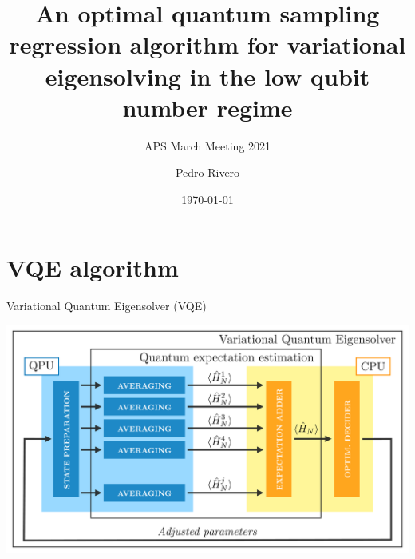 \documentclass[9pt, handout, aspectratio=169]{beamer}	%
\title{An optimal quantum sampling regression algorithm for variational eigensolving in the low qubit number regime}
\subtitle{APS March Meeting 2021}
\author{Pedro Rivero}
\institute{Illinois Institute of Technology \\ Argonne National Laboratory}
\date{\today}
\begin{document}
	\justify
	\setlength{\abovedisplayskip}{0pt}
	\setlength{\belowdisplayskip}{12pt}
	\setlength{\abovedisplayshortskip}{0pt}
	\setlength{\belowdisplayshortskip}{12pt}

\begin{frame}[plain,t]
	\titlepage
\end{frame}




\section{VQE algorithm}

\begin{frame}{Variational Quantum Eigensolver (VQE)}

	\begin{center}
		\includegraphics[width=.7\paperwidth]{Figures/VQE}
	\end{center}

\end{frame}

\end{document}

